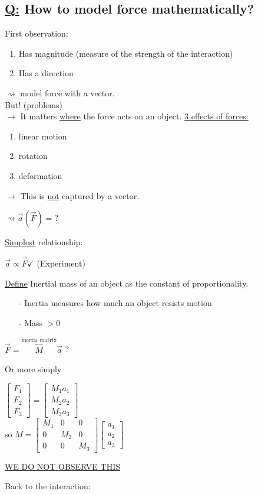 \documentclass[a4paper, 12pt]{article}
\begin{document}
\subsection{\underline{Q:} How to model force mathematically?}
First observation:
\begin{enumerate}
\item Has magnitude (measure of the strength of the interaction)
\item Has a direction
\end{enumerate}
$\rightsquigarrow$ model force with a vector.\\
But! (problems)\\
$\rightarrow$ It matters \underline{where} the force acts on an object. \underline{3 effects of forces:}
\begin{enumerate}
\item linear motion
\item rotation
\item deformation
\end{enumerate}
$\rightarrow$ This is \underline{not} captured by a vector.
\begin{center}
$\rightsquigarrow \vec{a}(\vec{F}) = ?$
\end{center}
\underline{Simplest} relationship:
\begin{center}
$\vec{a} \propto \vec{F} \checkmark$ (Experiment)
\end{center}
\underline{Define} Inertial mass of an object as the constant of proportionality.
\begin{itemize}
\item[-] Inertia measures how much an object resists motion
\item[-] Mass $>0$
\end{itemize}
\begin{center}
$\vec{F} = \overset{\text{inertia matrix}}{\overbrace{M}} \vec{a}$ ?
\end{center}
Or more simply
\begin{center}
$\begin{bmatrix}
F_1\\
F_2\\
F_3
\end{bmatrix}
= \begin{bmatrix}
M_1a_1\\
M_2a_2\\
M_3a_3
\end{bmatrix}$\\
so $M = 
\begin{bmatrix}
M_1 & 0 & 0\\
0 & M_2 & 0\\
0 & 0 & M_3
\end{bmatrix}
\begin{bmatrix}
a_1\\
a_2\\
a_3
\end{bmatrix}$\\
\end{center}
\begin{center}
\underline{WE DO NOT OBSERVE THIS}
\end{center}
Back to the interaction:
\end{document}
